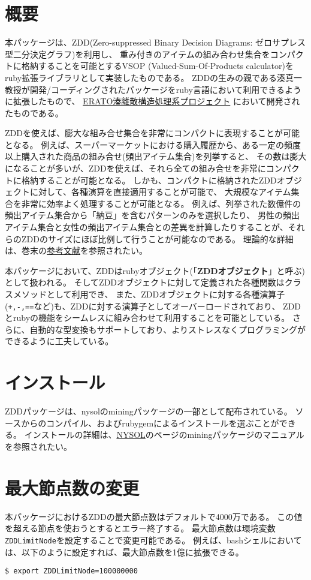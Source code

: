 
\section{概要\label{sect:abstract}}
本パッケージは、ZDD(Zero-suppressed Binary Decision Diagrams: ゼロサプレス型二分決定グラフ)を利用し、
重み付きのアイテムの組み合わせ集合をコンパクトに格納することを可能とするVSOP
(Valued-Sum-Of-Products calculator)\cite{minato2005}をruby拡張ライブラリとして実装したものである。
ZDDの生みの親である湊真一教授が開発/コーディングされたパッケージをruby言語において利用できるように拡張したもので、
\href{http://www-erato.ist.hokudai.ac.jp/index.php?language=jp}{ERATO湊離散構造処理系プロジェクト}
において開発されたものである。

ZDDを使えば、膨大な組み合せ集合を非常にコンパクトに表現することが可能となる。
例えば、スーパーマーケットにおける購入履歴から、ある一定の頻度以上購入された商品の組み合せ(頻出アイテム集合)を列挙すると、
その数は膨大になることが多いが、ZDDを使えば、それら全ての組み合せを非常にコンパクトに格納することが可能となる。
しかも、コンパクトに格納されたZDDオブジェクトに対して、各種演算を直接適用することが可能で、
大規模なアイテム集合を非常に効率よく処理することが可能となる。
例えば、列挙された数億件の頻出アイテム集合から「納豆」を含むパターンのみを選択したり、
男性の頻出アイテム集合と女性の頻出アイテム集合との差異を計算したりすることが、それらのZDDのサイズにほぼ比例して行うことが可能なのである。
理論的な詳細は、巻末の\hyperref[sect:bib]{参考文献}を参照されたい。

本パッケージにおいて、ZDDはrubyオブジェクト(「{\bf ZDDオブジェクト}」と呼ぶ)として扱われる。
そしてZDDオブジェクトに対して定義された各種関数はクラスメソッドとして利用でき、
また、ZDDオブジェクトに対する各種演算子(\verb|+,-,==|など)も、ZDDに対する演算子としてオーバーロードされており、
ZDDとrubyの機能をシームレスに組み合わせて利用することを可能としている。
さらに、自動的な型変換もサポートしており、よりストレスなくプログラミングができるように工夫している。

\section{インストール\label{sect:install}}
ZDDパッケージは、nysolのminingパッケージの一部として配布されている。
ソースからのコンパイル、およびrubygemによるインストールを選ぶことができる。
インストールの詳細は、\href{http://www.nysol.jp}{NYSOL}のページのminingパッケージのマニュアルを参照されたい。

\section{最大節点数の変更}
本パッケージにおけるZDDの最大節点数はデフォルトで4000万である。
この値を超える節点を使おうとするとエラー終了する。
最大節点数は環境変数\verb|ZDDLimitNode|を設定することで変更可能である。
例えば、bashシェルにおいては、以下のように設定すれば、最大節点数を1億に拡張できる。
\begin{Verbatim}[baselinestretch=0.7,frame=single]
$ export ZDDLimitNode=100000000
\end{Verbatim}

